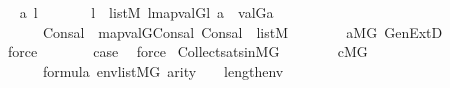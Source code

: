 \begin{isabellebody}
\ \isamarkupfalse%
\ a{\isacharprime}{\kern0pt}\ l{\isacharprime}{\kern0pt}\ \isanewline
\ \ \ \ \ \ {\isachardoublequoteopen}l{\isacharprime}{\kern0pt}\ {\isasymin}\ list{\isacharparenleft}{\kern0pt}M{\isacharparenright}{\kern0pt}{\isachardoublequoteclose}\ {\isachardoublequoteopen}l{\isacharequal}{\kern0pt}map{\isacharparenleft}{\kern0pt}val{\isacharparenleft}{\kern0pt}G{\isacharparenright}{\kern0pt}{\isacharcomma}{\kern0pt}l{\isacharprime}{\kern0pt}{\isacharparenright}{\kern0pt}{\isachardoublequoteclose}\ {\isachardoublequoteopen}a\ {\isacharequal}{\kern0pt}\ val{\isacharparenleft}{\kern0pt}G{\isacharcomma}{\kern0pt}a{\isacharprime}{\kern0pt}{\isacharparenright}{\kern0pt}{\isachardoublequoteclose}\isanewline
\ \ \ \ \ \ {\isachardoublequoteopen}Cons{\isacharparenleft}{\kern0pt}a{\isacharcomma}{\kern0pt}l{\isacharparenright}{\kern0pt}\ {\isacharequal}{\kern0pt}\ map{\isacharparenleft}{\kern0pt}val{\isacharparenleft}{\kern0pt}G{\isacharparenright}{\kern0pt}{\isacharcomma}{\kern0pt}Cons{\isacharparenleft}{\kern0pt}a{\isacharprime}{\kern0pt}{\isacharcomma}{\kern0pt}l{\isacharprime}{\kern0pt}{\isacharparenright}{\kern0pt}{\isacharparenright}{\kern0pt}{\isachardoublequoteclose}\ {\isachardoublequoteopen}Cons{\isacharparenleft}{\kern0pt}a{\isacharprime}{\kern0pt}{\isacharcomma}{\kern0pt}l{\isacharprime}{\kern0pt}{\isacharparenright}{\kern0pt}\ {\isasymin}\ list{\isacharparenleft}{\kern0pt}M{\isacharparenright}{\kern0pt}{\isachardoublequoteclose}\isanewline
\ \ \ \ \ \ \isamarkupfalse%
\ {\isacartoucheopen}a{\isasymin}M{\isacharbrackleft}{\kern0pt}G{\isacharbrackright}{\kern0pt}{\isacartoucheclose}\ GenExtD\isanewline
\ \ \ \ \ \ \isamarkupfalse%
\ force\isanewline
\ \ \ \ \isamarkupfalse%
\ \isamarkupfalse%
\ {\isacharquery}{\kern0pt}case\ \isamarkupfalse%
\ force\isanewline
{}\isamarkupfalse%
%
\endisatagproof
{\isafoldproof}%
%
\isadelimproof
\isanewline
%
\endisadelimproof
\isanewline
\isanewline
{}\isamarkupfalse%
\ Collect{\isacharunderscore}{\kern0pt}sats{\isacharunderscore}{\kern0pt}in{\isacharunderscore}{\kern0pt}MG\ {\isacharcolon}{\kern0pt}\isanewline
\ \ \isanewline
\ \ \ \ {\isachardoublequoteopen}c{\isasymin}M{\isacharbrackleft}{\kern0pt}G{\isacharbrackright}{\kern0pt}{\isachardoublequoteclose}\isanewline
\ \ \ \ {\isachardoublequoteopen}{\isasymphi}\ {\isasymin}\ formula{\isachardoublequoteclose}\ {\isachardoublequoteopen}env{\isasymin}list{\isacharparenleft}{\kern0pt}M{\isacharbrackleft}{\kern0pt}G{\isacharbrackright}{\kern0pt}{\isacharparenright}{\kern0pt}{\isachardoublequoteclose}\ {\isachardoublequoteopen}arity{\isacharparenleft}{\kern0pt}{\isasymphi}{\isacharparenright}{\kern0pt}\ {\isasymle}\ {}\ {\isacharhash}{\kern0pt}{\isacharplus}{\kern0pt}\ length{\isacharparenleft}{\kern0pt}env{\isacharparenright}{\kern0pt}{\isachardoublequoteclose}\isanewline

\end{isabellebody}
